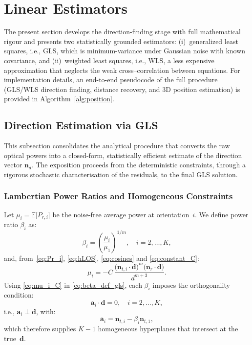 \documentclass[journal]{IEEEtran}
\begin{document}
\section{Linear Estimators}
\label{sec:Lineal}

The present section develops the direction-finding stage with full mathematical
rigour and presents two statistically grounded estimators:
(i)~generalized least squares, i.e., GLS, which is minimum-variance under
Gaussian noise with known covariance, and
(ii)~weighted least squares, i.e., WLS, a less expensive
approximation that neglects the weak cross–correlation between
equations.
For implementation details, an end-to-end pseudocode of the full procedure (GLS/WLS direction finding, distance recovery, and 3D position estimation) is provided in Algorithm~\ref{alg:position}.


\subsection{Direction Estimation via GLS}
\label{subsec:gls_direction}

This subsection consolidates the analytical procedure that converts the raw optical powers into a closed-form, statistically efficient estimate of the direction vector $\mathbf{n}_d$. The exposition proceeds from the deterministic constraints, through a rigorous stochastic characterisation of the residuals, to the final GLS solution. 

\subsubsection{Lambertian Power Ratios and Homogeneous Constraints}
Let $\mu_i=\mathbb E\!\bigl[P_{r,i}\bigr]$ be the noise-free average power at
orientation~$i$. We define power ratio $\beta_i$ as:
\begin{equation}
  \beta_i=\left(\frac{\mu_i}{\mu_1}\right)^{1/m}, \quad i=2,\ldots,K,
  \label{eq:beta_def_gls}
\end{equation}
and, from~\eqref{eq:Pr_i}, \eqref{eq:hLOS}, \eqref{eq:cosines} and \eqref{eq:constant_C}:
\begin{equation}
\mu_i=-C\,\frac{\bigl(\mathbf{n}_{t,i}\cdot\mathbf{d}\bigr)^{m}
\bigl(\mathbf{n}_r\cdot\mathbf{d}\bigr)}{d^{m+3}}.
\label{eq:mu_i_C}
\end{equation}
Using \eqref{eq:mu_i_C} in \eqref{eq:beta_def_gls}, each $\beta_i$ imposes the orthogonality condition:
\begin{equation}
  \mathbf a_i\cdot
  \mathbf d=0,
  \quad
  i=2,\ldots,K,
  \label{eq:homog_gls}
\end{equation}
i.e., $\mathbf a_i \perp \mathbf d$, with:
\begin{equation}
\mathbf a_i\!=\!\mathbf n_{t,i}-\beta_i\mathbf n_{t,1}, 
\label{eq:definition_a_i}
\end{equation}
which therefore supplies $K-1$ homogeneous hyperplanes that intersect at the true~$\mathbf d$.
\end{document}
